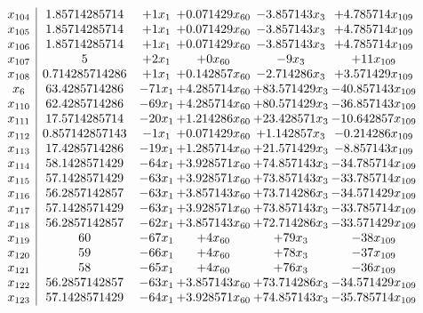 \documentclass[11pt]{article}
\begin{document}
\[\begin{array}{c| c c@{\hskip 2pt} c@{\hskip 2pt} c@{\hskip 2pt} c@{\hskip 2pt} }
 x_{104}   &  1.85714285714 & + 1 x_{1} & + 0.071429 x_{60} & -3.857143 x_{3} & + 4.785714 x_{109}\\
 x_{105}   &  1.85714285714 & + 1 x_{1} & + 0.071429 x_{60} & -3.857143 x_{3} & + 4.785714 x_{109}\\
 x_{106}   &  1.85714285714 & + 1 x_{1} & + 0.071429 x_{60} & -3.857143 x_{3} & + 4.785714 x_{109}\\
 x_{107}   &  5 & + 2 x_{1} & + 0 x_{60} & -9 x_{3} & + 11 x_{109}\\
 x_{108}   &  0.714285714286 & + 1 x_{1} & + 0.142857 x_{60} & -2.714286 x_{3} & + 3.571429 x_{109}\\
 x_{6}   &  63.4285714286 & -71 x_{1} & + 4.285714 x_{60} & + 83.571429 x_{3} & -40.857143 x_{109}\\
 x_{110}   &  62.4285714286 & -69 x_{1} & + 4.285714 x_{60} & + 80.571429 x_{3} & -36.857143 x_{109}\\
 x_{111}   &  17.5714285714 & -20 x_{1} & + 1.214286 x_{60} & + 23.428571 x_{3} & -10.642857 x_{109}\\
 x_{112}   &  0.857142857143 & -1 x_{1} & + 0.071429 x_{60} & + 1.142857 x_{3} & -0.214286 x_{109}\\
 x_{113}   &  17.4285714286 & -19 x_{1} & + 1.285714 x_{60} & + 21.571429 x_{3} & -8.857143 x_{109}\\
 x_{114}   &  58.1428571429 & -64 x_{1} & + 3.928571 x_{60} & + 74.857143 x_{3} & -34.785714 x_{109}\\
 x_{115}   &  57.1428571429 & -63 x_{1} & + 3.928571 x_{60} & + 73.857143 x_{3} & -33.785714 x_{109}\\
 x_{116}   &  56.2857142857 & -63 x_{1} & + 3.857143 x_{60} & + 73.714286 x_{3} & -34.571429 x_{109}\\
 x_{117}   &  57.1428571429 & -63 x_{1} & + 3.928571 x_{60} & + 73.857143 x_{3} & -33.785714 x_{109}\\
 x_{118}   &  56.2857142857 & -62 x_{1} & + 3.857143 x_{60} & + 72.714286 x_{3} & -33.571429 x_{109}\\
 x_{119}   &  60 & -67 x_{1} & + 4 x_{60} & + 79 x_{3} & -38 x_{109}\\
 x_{120}   &  59 & -66 x_{1} & + 4 x_{60} & + 78 x_{3} & -37 x_{109}\\
 x_{121}   &  58 & -65 x_{1} & + 4 x_{60} & + 76 x_{3} & -36 x_{109}\\
 x_{122}   &  56.2857142857 & -63 x_{1} & + 3.857143 x_{60} & + 73.714286 x_{3} & -34.571429 x_{109}\\
 x_{123}   &  57.1428571429 & -64 x_{1} & + 3.928571 x_{60} & + 74.857143 x_{3} & -35.785714 x_{109}\\

\end{array}\]
\end{document}
